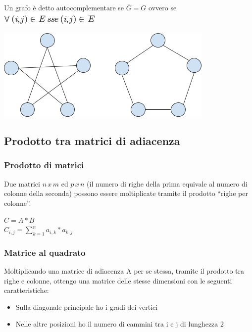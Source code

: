 \documentclass{article}
\providecommand{\tightlist}{%
  \setlength{\itemsep}{0pt}\setlength{\parskip}{0pt}}
\begin{document}
{{{{Un grafo è detto autocomplementare se $\overline{G}=G$ ovvero se
}\includegraphics{images/image405.png}

{\includegraphics{images/image532.png}}

{}

\hypertarget{h.akx1r9fzvwzo}{\subsection{\texorpdfstring{{Prodotto tra
matrici di
adiacenza}}{Prodotto tra matrici di adiacenza}}\label{h.akx1r9fzvwzo}}

{}

\hypertarget{h.c39ti8il3qtf}{\subsubsection{\texorpdfstring{{Prodotto di
matrici}}{Prodotto di matrici}}\label{h.c39ti8il3qtf}}

{Due matrici $n\,x\,m$ ed $p\,x\,n$ (il numero di righe della prima equivale al numero di colonne della seconda) possono essere moltiplicate tramite il prodotto ``righe per colonne''.}

$C = A*B$ \\
$C_{i,j}=\sum_{k=1}^{n}{a_{i,k}*a_{k,j}}$

\hypertarget{h.md5vuljp7xm}{\subsubsection{\texorpdfstring{{Matrice al
quadrato}}{Matrice al quadrato}}\label{h.md5vuljp7xm}}

{}

{Moltiplicando una matrice di adiacenza A per se stessa, tramite il
prodotto tra righe e colonne, ottengo una matrice delle stesse
dimensioni con le seguenti caratteristiche:}

\begin{itemize}
\tightlist
\item
  {Sulla diagonale principale ho i gradi dei vertici}
\item
  {Nelle altre posizioni ho il numero di cammini tra i e j di lunghezza
  2}
\end{itemize}

}}}
\end{document}
